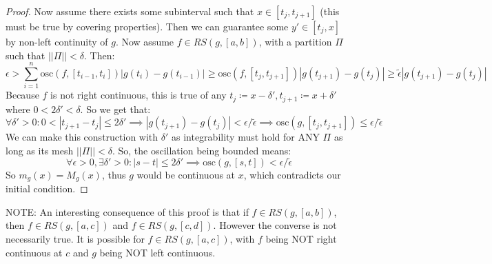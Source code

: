 \documentclass[10pt,letterpaper]{article} %
\begin{document}
\begin{proof}
Now assume there exists some subinterval such that $x \in [t_j, t_{j+1}]$ (this must be true by covering properties). Then we can guarantee some $y' \in [t_j, x]$ by non-left continuity of $g$. Now assume $f \in RS(g, [a, b])$, with a partition $\Pi$ such that $||\Pi|| < \delta$. Then:
\begin{equation*}
  \epsilon > \sum_{i=1}^{n}\text{osc}(f, [t_{i-1}, t_i])|g(t_i) - g(t_{i-1})| \geqslant \text{osc}(f, [t_j, t_{j+1}])|g(t_{j+1}) - g(t_j)| \geqslant \tilde{\epsilon}|g(t_{j+1}) - g(t_j)|
\end{equation*}
Because $f$ is not right continuous, this is true of any $t_j \coloneq x - \delta', t_{j+1} \coloneq x + \delta'$ where $0 < 2\delta' < \delta$. So we get that:
\begin{equation*}
  \forall \delta' > 0: 0 < |t_{j+1} - t_j| \leqslant 2\delta' \implies |g(t_{j+1}) - g(t_j)| < \epsilon/\tilde{\epsilon} \implies \text{osc}(g, [t_j, t_{j+1}]) \leqslant \epsilon/\tilde{\epsilon}
\end{equation*} 
We can make this construction with $\delta'$ as integrability must hold for ANY $\Pi$ as long as its mesh $||\Pi|| < \delta$. So, the oscillation being bounded means:
\begin{equation*}
  \forall \epsilon > 0, \exists \delta' > 0: |s-t| \leqslant 2\delta' \implies \text{osc}(g, [s, t]) < \epsilon/\tilde{\epsilon}
\end{equation*}
So $m_g(x) = M_g(x)$, thus $g$ would be continuous at $x$, which contradicts our initial condition.
\end{proof}
NOTE: An interesting consequence of this proof is that if $f \in RS(g, [a, b])$, then $f \in RS(g, [a, c])$ and $f \in RS(g, [c, d])$. However the converse is not necessarily true. It is possible for $f \in RS(g, [a, c])$, with $f$ being NOT right continuous at $c$ and $g$ being NOT left continuous.\\
\end{document}
